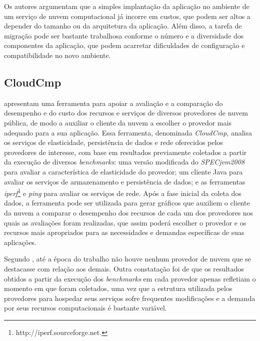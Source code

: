 Os autores argumentam que a simples implantação da aplicação no ambiente de um
serviço de nuvem computacional já incorre em custos, que podem ser altos a 
depender do tamanho ou da arquitetura da aplicação. Além disso, a tarefa de
migração pode ser bastante trabalhosa conforme o número e a diversidade dos 
componentes da aplicação, que podem acarretar dificuldades de configuração e
compatibilidade no novo ambiente.


\subsection{CloudCmp}
 apresentam uma ferramenta para apoiar a avaliação e a comparação do
desempenho e do custo dos recursos e serviços de diversos provedores de nuvem
pública, de modo a auxiliar o cliente da nuvem a escolher o provedor mais adequado para a sua
aplicação. Essa ferramenta, denominada {\em CloudCmp}, analisa
os serviços de elasticidade, persistência de dados e rede oferecidos pelos provedores
de interesse, com base em resultados previamente coletados a partir da execução de diversos
{\em benchmarks}: uma versão modificada do {\em SPECjvm2008}~\cite{SPECjvm2008}
para avaliar a característica de elasticidade do provedor; um cliente Java para avaliar os serviços de
armazenamento e persistência de dados; e as ferramentas {\em iperf}\footnote{http://iperf.sourceforge.net. }
e {\em ping} para avaliar os serviços de rede. Após a fase inicial da coleta dos dados, a ferramenta pode ser utilizada para gerar gráficos que auxiliem o
cliente da nuvem a comparar o desempenho dos recursos de cada um
dos provedores nos quais as avaliações foram realizadas, que assim poderá escolher o provedor e os recursos mais apropriados para as necessidades e demandas específicas de suas aplicações. 


Segundo , até a época do trabalho não houve
nenhum provedor de nuvem que se destacasse com relação aos demais. Outra constatação foi de que os resultados
obtidos a partir da execução dos {\em benchmarks} em cada provedor apenas refletiam o momento em que foram coletados, uma vez que a estrutura utilizada pelos provedores para hospedar seus serviços sofre frequentes modificações e a demanda por seus recursos computacionais é bastante variável.

